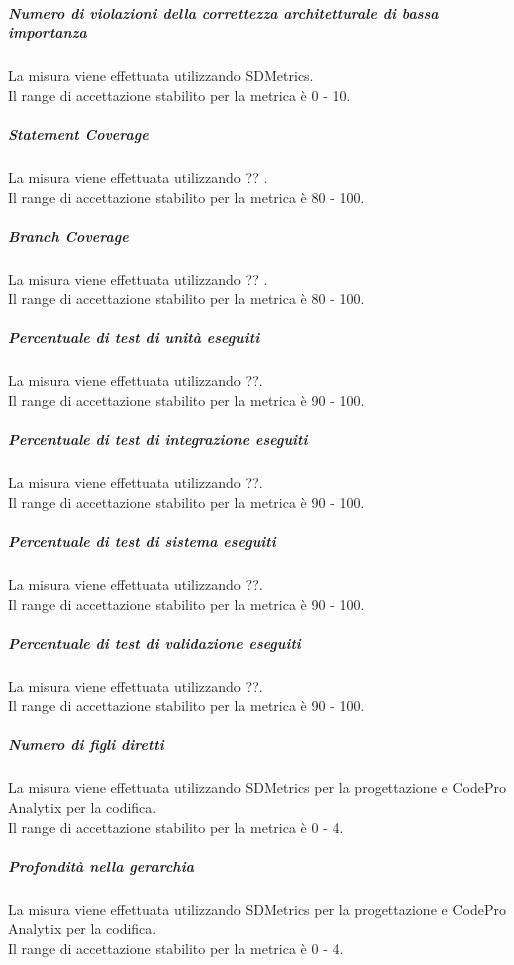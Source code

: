 			\subparagraph{Numero di violazioni della correttezza architetturale di bassa importanza}
			La misura viene effettuata utilizzando SDMetrics.
			\\Il range di accettazione stabilito per la metrica è 0 - 10.
			
			\subparagraph{Statement Coverage}
			La misura viene effettuata utilizzando ?? .
			\\Il range di accettazione stabilito per la metrica è 80 - 100.
			
			\subparagraph{Branch Coverage}
			La misura viene effettuata utilizzando ?? .
			\\Il range di accettazione stabilito per la metrica è 80 - 100.
			
			\subparagraph{Percentuale di test di unità eseguiti}
			La misura viene effettuata utilizzando ??.
			\\Il range di accettazione stabilito per la metrica è 90 - 100.
			
			\subparagraph{Percentuale di test di integrazione eseguiti}
			La misura viene effettuata utilizzando ??.
			\\Il range di accettazione stabilito per la metrica è 90 - 100.
			
			\subparagraph{Percentuale di test di sistema eseguiti}
			La misura viene effettuata utilizzando ??.
			\\Il range di accettazione stabilito per la metrica è 90 - 100.
			
			\subparagraph{Percentuale di test di validazione eseguiti}
			La misura viene effettuata utilizzando ??.
			\\Il range di accettazione stabilito per la metrica è 90 - 100.
			
			\subparagraph{Numero di figli diretti}
			La misura viene effettuata utilizzando SDMetrics per la progettazione e CodePro Analytix per la codifica.
			\\Il range di accettazione stabilito per la metrica è 0 - 4.
			
			\subparagraph{Profondità nella gerarchia}
			La misura viene effettuata utilizzando SDMetrics per la progettazione e CodePro Analytix per la codifica.
			\\Il range di accettazione stabilito per la metrica è 0 - 4.

